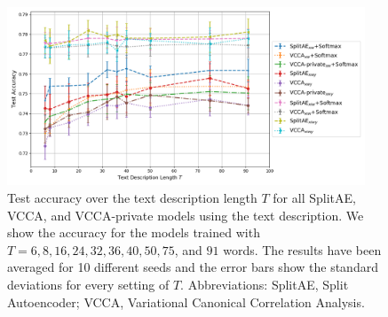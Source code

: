 
\begin{figure}[t]
    \centering
    \includegraphics[width=0.95\textwidth]{figures_and_tables/varying_t_NEW2.png}
    \caption{Test accuracy over the text description length $T$ for all SplitAE, VCCA, and VCCA-private models using the text description. We show the accuracy for the models trained with $T = 6, 8, 16, 24, 32, 36, 40, 50, 75$, and $91$ words. The results have been averaged for 10 different seeds and the error bars show the standard deviations for every setting of $T$. Abbreviations: SplitAE, Split Autoencoder; VCCA, Variational Canonical Correlation Analysis.}
    \label{fig:varying_t}
\end{figure}